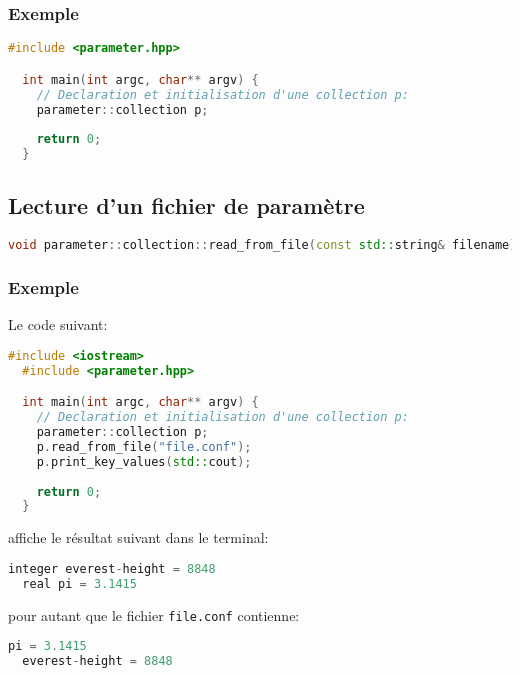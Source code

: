 \subsubsection{Exemple}
\begin{lstlisting}[language=c++,frame=single,basicstyle=\ttfamily\footnotesize]
  #include <parameter.hpp>

  int main(int argc, char** argv) {
    // Declaration et initialisation d'une collection p:
    parameter::collection p;
    
    return 0;
  }
\end{lstlisting}



\subsection{Lecture d'un fichier de param\`etre}
\begin{lstlisting}[language=c++,frame=single,basicstyle=\ttfamily\footnotesize]
  void parameter::collection::read_from_file(const std::string& filename);
\end{lstlisting}

\subsubsection{Exemple}
Le code suivant:
\begin{lstlisting}[language=c++,frame=single,basicstyle=\ttfamily\footnotesize]
  #include <iostream>
  #include <parameter.hpp>

  int main(int argc, char** argv) {
    // Declaration et initialisation d'une collection p:
    parameter::collection p;
    p.read_from_file("file.conf");
    p.print_key_values(std::cout);
    
    return 0;
  }
\end{lstlisting}
affiche le r\'esultat suivant dans le terminal:
\begin{lstlisting}[language=c++,frame=single,basicstyle=\ttfamily\footnotesize]
  integer everest-height = 8848
  real pi = 3.1415
\end{lstlisting}
pour autant que le fichier \texttt{file.conf} contienne:
\begin{lstlisting}[language=c++,frame=single,basicstyle=\ttfamily\footnotesize]
  pi = 3.1415
  everest-height = 8848
\end{lstlisting}



